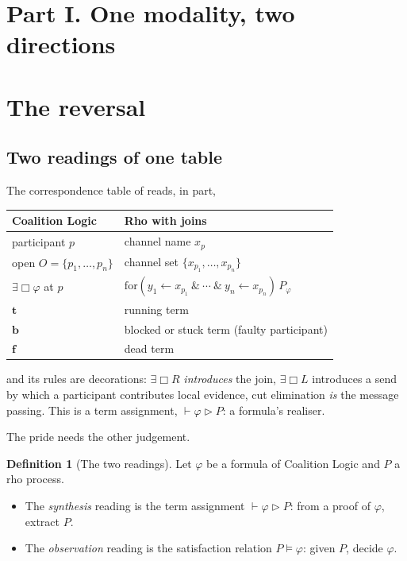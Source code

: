 \documentclass[11pt,a4paper]{article}
\theoremstyle{plain}
\theoremstyle{definition}
\newtheorem{definition}[theorem]{Definition}
\theoremstyle{remark}
\newcommand{\Ebox}{\exists\Box}
\newcommand{\tv}{\mathbf{t}}
\newcommand{\fv}{\mathbf{f}}
\newcommand{\bv}{\mathbf{b}}
\begin{document}
\section*{Part I. One modality, two directions}

\section{The reversal}\label{sec:reversal}

\subsection{Two readings of one table}

The correspondence table of \cite[\S5.2]{consensus} reads, in part,
\begin{center}
\begin{tabular}{@{}ll@{}}
\toprule
Coalition Logic & Rho with joins\\
\midrule
participant $p$ & channel name $x_p$\\
open $O = \{p_1,\dots,p_n\}$ & channel set $\{x_{p_1},\dots,x_{p_n}\}$\\
$\Ebox\varphi$ at $p$ & $\mathrm{for}(y_1\leftarrow x_{p_1}\ \&\ \cdots\ \&\
   y_n\leftarrow x_{p_n})\,P_\varphi$\\
$\tv$ & running term\\
$\bv$ & blocked or stuck term (faulty participant)\\
$\fv$ & dead term\\
\bottomrule
\end{tabular}
\end{center}
and its rules are decorations: $\Ebox R$ \emph{introduces} the join, $\Ebox L$
introduces a send by which a participant contributes local evidence, cut
elimination \emph{is} the message passing. This is a term assignment,
$\vdash \varphi \triangleright P$: a formula's realiser.

The pride needs the other judgement.

\begin{definition}[The two readings]\label{def:tworeadings}
Let $\varphi$ be a formula of Coalition Logic and $P$ a rho process.
\begin{itemize}[leftmargin=1.4em]
\item The \emph{synthesis} reading is the term assignment
      $\vdash \varphi \triangleright P$: from a proof of $\varphi$, extract $P$.
\item The \emph{observation} reading is the satisfaction relation
      $P \models \varphi$: given $P$, decide $\varphi$.
\end{itemize}
\end{definition}
\end{document}
